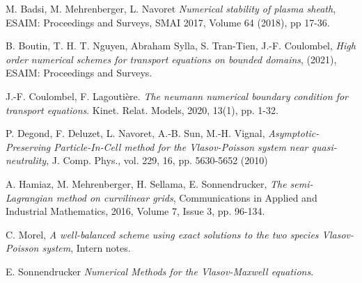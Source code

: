\documentclass[12pt,english]{article}
\theoremstyle{plain}\newtheorem{theorem}{Theorem}[section]
\theoremstyle{plain}\newtheorem{corollary}{Corollary}[section]
\theoremstyle{plain}\newtheorem{lemma}{Lemma}[section]
\begin{document}
\begin{thebibliography}{}

{\sc M. Badsi, M. Mehrenberger, L. Navoret}
\textit{Numerical stability of plasma sheath}, 
ESAIM: Proceedings and Surveys, SMAI 2017, Volume 64 (2018), pp 17-36.


{\sc B. Boutin, T. H. T. Nguyen, Abraham Sylla, S. Tran-Tien, J.-F. Coulombel}, 
\textit{High order numerical schemes for transport equations on bounded domains}, 
(2021), ESAIM: Proceedings and Surveys.

{\sc J.-F. Coulombel,  F. Lagouti\`ere}. 
\textit{The neumann numerical boundary condition for transport equations}. 
Kinet. Relat. Models,   2020, 13(1), pp. 1-32. 

{\sc P. Degond, F. Deluzet, L. Navoret, A.-B. Sun, M.-H. Vignal}, 
\textit{Asymptotic-Preserving Particle-In-Cell method for the Vlasov-Poisson system near quasi-neutrality}, 
J. Comp. Phys., vol. 229, 16, pp. 5630-5652 (2010)

{\sc A. Hamiaz, M. Mehrenberger, H. Sellama, E. Sonnendrucker}, 
\textit{The semi-Lagrangian method on curvilinear grids}, 
Communications in Applied and Industrial Mathematics, 2016, Volume 7, Issue 3, pp. 96-134.


{\sc C. Morel}, 
\textit{A well-balanced scheme using exact solutions to the two species Vlasov-Poisson system}, 
Intern notes. 

{\sc E. Sonnendrucker}
\textit{Numerical Methods for the Vlasov-Maxwell equations}.  

\end{thebibliography}
\end{document}
